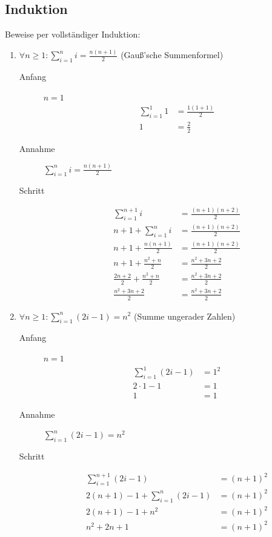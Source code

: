 \documentclass[11pt, a4paper]{article}
\begin{document}
\subsection{Induktion}
Beweise per vollständiger Induktion:
\begin{enumerate}
	\item $\forall n \geq 1 : \sum_{i=1}^n i = \frac{n(n+1)}{2}$ (Gauß'sche Summenformel)
		\begin{description}
			\item[Anfang] $n=1$
				\begin{align*}
					\sum_{i=1}^1 1 &= \frac{1(1+1)}{2} \\
					1 &= \frac{2}{2}
				\end{align*}
			\item[Annahme] $\sum_{i=1}^n i = \frac{n(n+1)}{2}$
			\item[Schritt] 
			\begin{align*}
				\sum_{i=1}^{n+1} i &= \frac{(n+1)(n+2)}{2} \\
				n+1 + \sum_{i=1}^n i &= \frac{(n+1)(n+2)}{2} \\
				n+1 + \frac{n(n+1)}{2} &= \frac{(n+1)(n+2)}{2} \\
				n+1 + \frac{n^2 + n}{2} &= \frac{n^2 + 3n + 2}{2} \\
				\frac{2n+2}{2} + \frac{n^2 + n}{2} &= \frac{n^2 + 3n + 2}{2} \\
				\frac{n^2 + 3n + 2}{2} &= \frac{n^2 + 3n + 2}{2}
			\end{align*}
		\end{description}
	\item $\forall n \geq 1 : \sum_{i=1}^n (2i-1) = n^2$ (Summe ungerader Zahlen)
		\begin{description}
			\item[Anfang] $n=1$
				\begin{align*}
					\sum_{i=1}^1 (2i-1) &= 1^2 \\
					2 \cdot 1-1 &= 1 \\
					1 &= 1
				\end{align*}
			\item[Annahme] $\sum_{i=1}^n (2i-1) = n^2$
			\item[Schritt] 
				\begin{align*}
					\sum_{i=1}^{n+1} (2i-1) &= (n+1)^2 \\
					2(n+1) - 1 + \sum_{i=1}^n (2i-1) &= (n+1)^2 \\
					2(n+1) - 1 + n^2 &= (n+1)^2 \\
					n^2+2n+1 &= (n+1)^2 \\

\end{align*}
\end{description}
\end{enumerate}
\end{document}
